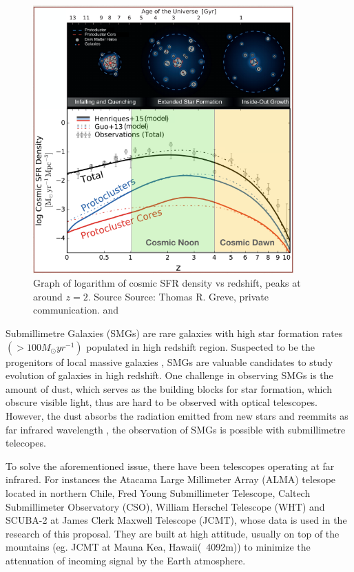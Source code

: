 \documentclass{article}
\begin{document}
\begin{figure}
    \centering
    \includegraphics[width=100mm]{cosmic noon.png}
    \caption{Graph of logarithm of cosmic SFR density vs redshift, peaks at around $z = 2$. Source Source: Thomas R. Greve, private communication. and \parencite{Zotti2018}}
    \label{fig:cosmicnoon}
\end{figure}


\noindent Submillimetre Galaxies (SMGs) are rare galaxies with high star formation rates $(>100M_\odot yr^{-1})$ \parencite{DaCunha2021} populated in high redshift region. Suspected to be the progenitors of local massive galaxies \parencite{Casey2014}, SMGs are valuable candidates to study evolution of galaxies in high redshift. One challenge in observing SMGs is the amount of dust, which serves as the building blocks for star formation, which obscure visible light, thus are hard to be observed with optical telescopes. However, the dust absorbs the radiation emitted from new stars and reemmits as far infrared wavelength \parencite{Casey2014}, the observation of SMGs is possible with submillimetre telecopes. 
\medskip

\noindent To solve the aforementioned issue, there have been telescopes operating at far infrared. For instances the Atacama Large Millimeter Array (ALMA) telesope located in northern Chile, Fred Young Submillimeter Telescope, Caltech Submillimeter Observatory (CSO), William Herschel Telescope (WHT)\parencite{Phillips2013} and SCUBA-2 at James Clerk Maxwell Telescope (JCMT), whose data is used in the research of this proposal. They are built at high attitude, usually on top of the mountains (eg. JCMT at Mauna Kea, Hawaii(~4092m)) to minimize the attenuation of incoming signal by the Earth atmosphere.\parencite{Phillips2013}
\medskip
\end{document}
